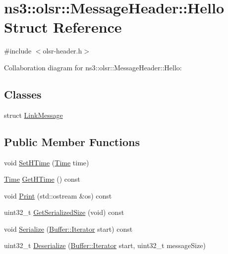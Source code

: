 \hypertarget{structns3_1_1olsr_1_1MessageHeader_1_1Hello}{}\section{ns3\+:\+:olsr\+:\+:Message\+Header\+:\+:Hello Struct Reference}
\label{structns3_1_1olsr_1_1MessageHeader_1_1Hello}


{\ttfamily \#include $<$olsr-\/header.\+h$>$}



Collaboration diagram for ns3\+:\+:olsr\+:\+:Message\+Header\+:\+:Hello\+:
\subsection*{Classes}
\begin{DoxyCompactItemize}
\item 
struct \hyperlink{structns3_1_1olsr_1_1MessageHeader_1_1Hello_1_1LinkMessage}{Link\+Message}
\end{DoxyCompactItemize}
\subsection*{Public Member Functions}
\begin{DoxyCompactItemize}
\item 
void \hyperlink{structns3_1_1olsr_1_1MessageHeader_1_1Hello_a393fd82122e9554019d4059d5bbf705b}{Set\+H\+Time} (\hyperlink{classns3_1_1Time}{Time} time)
\item 
\hyperlink{classns3_1_1Time}{Time} \hyperlink{structns3_1_1olsr_1_1MessageHeader_1_1Hello_aa5bf473b19bc8da0ebd6543a7368d814}{Get\+H\+Time} () const 
\item 
void \hyperlink{structns3_1_1olsr_1_1MessageHeader_1_1Hello_a23b35236d7d96cbcdffc3095e797da97}{Print} (std\+::ostream \&os) const 
\item 
uint32\+\_\+t \hyperlink{structns3_1_1olsr_1_1MessageHeader_1_1Hello_ad2862d60d2ef6372d01d0e1786d57827}{Get\+Serialized\+Size} (void) const 
\item 
void \hyperlink{structns3_1_1olsr_1_1MessageHeader_1_1Hello_a842601093dd98a192375bf4cca885670}{Serialize} (\hyperlink{classns3_1_1Buffer_1_1Iterator}{Buffer\+::\+Iterator} start) const 
\item 
uint32\+\_\+t \hyperlink{structns3_1_1olsr_1_1MessageHeader_1_1Hello_a500cb55e5f8de7afc7bece2a0237e090}{Deserialize} (\hyperlink{classns3_1_1Buffer_1_1Iterator}{Buffer\+::\+Iterator} start, uint32\+\_\+t message\+Size)
\end{DoxyCompactItemize}
